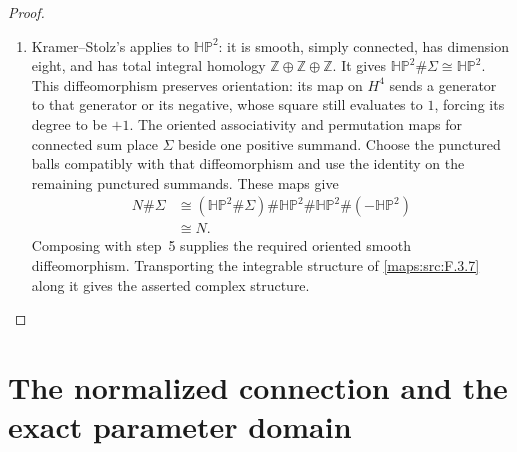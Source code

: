 \begin{proof}
\begin{enumerate}[label={$\langle1\rangle$\arabic*.}]
\item Kramer--Stolz's
\cite[Theorem~A, p.~178]{IVVKramerStolz} applies to
$\mathbb H\mathbb P^2$: it is smooth, simply connected, has dimension
eight, and has total integral homology $\mathbb Z\oplus\mathbb Z
\oplus\mathbb Z$. It gives
$\mathbb H\mathbb P^2\#\Sigma\cong\mathbb H\mathbb P^2$.
This diffeomorphism preserves orientation: its map on $H^4$ sends
a generator to that generator or its negative, whose square still
evaluates to $1$, forcing its degree to be $+1$.
The oriented associativity and permutation maps for connected sum
place $\Sigma$ beside one positive summand. Choose the punctured
balls compatibly with that diffeomorphism and use the identity on
the remaining punctured summands. These maps give
\[
\begin{aligned}
N\#\Sigma
&\cong(\mathbb H\mathbb P^2\#\Sigma)\#\mathbb H\mathbb P^2
       \#\mathbb H\mathbb P^2\#(-\mathbb H\mathbb P^2)\\
&\cong N.
\end{aligned}
\]
Composing with step~5 supplies the required oriented smooth
diffeomorphism. Transporting the integrable structure of
\cref{maps:src:F.3.7} along it gives the asserted complex structure.
\end{enumerate}
\end{proof}


\section{The normalized connection and the exact parameter domain}










